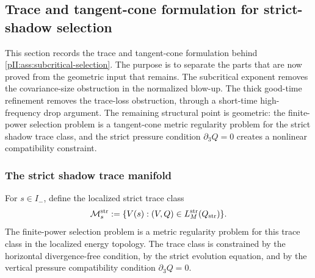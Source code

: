 \documentclass[11pt]{article}
\numberwithin{equation}{section}
\theoremstyle{plain}
\theoremstyle{definition}
\theoremstyle{remark}
\newcommand{\str}{\mathrm{str}}
\begin{document}
\subsection{Trace and tangent-cone formulation for strict-shadow selection}\label{pII:sec:metric-regularity}

This section records the trace and tangent-cone formulation behind \cref{pII:ass:subcritical-selection}.  The purpose is to separate the parts that are now proved from the geometric input that remains.  The subcritical exponent removes the covariance-size obstruction in the normalized blow-up.  The thick good-time refinement removes the trace-loss obstruction, through a short-time high-frequency drop argument.  The remaining structural point is geometric: the finite-power selection problem is a tangent-cone metric regularity problem for the strict shadow trace class, and the strict pressure condition $\partial_3Q=0$ creates a nonlinear compatibility constraint.

\subsubsection{The strict shadow trace manifold}

For $s\in I_-$, define the localized strict trace class
\begin{equation}\label{pII:eq:strict-trace-class}
        \mathcal M_s^{\str}
        :=\{V(s):(V,Q)\in L_M^{\str}(Q_{\rm str})\}.
\end{equation}
The finite-power selection problem is a metric regularity problem for this trace class in the localized energy topology.  The trace class is constrained by the horizontal divergence-free condition, by the strict evolution equation, and by the vertical pressure compatibility condition $\partial_3Q=0$.
\end{document}
